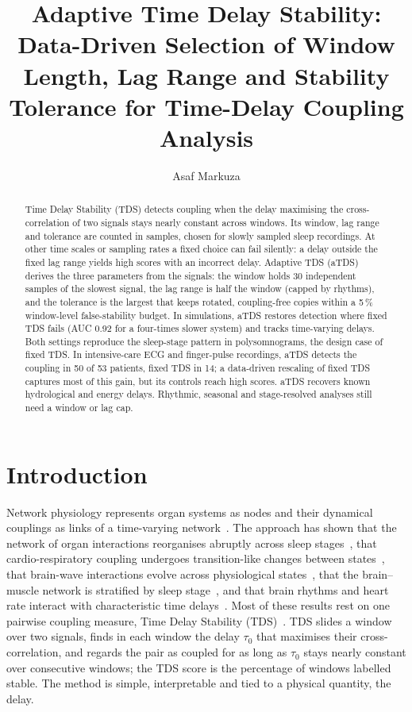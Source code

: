 \documentclass[11pt,a4paper]{article}
\title{Adaptive Time Delay Stability: Data-Driven Selection of Window Length, Lag Range and Stability Tolerance for Time-Delay Coupling Analysis}
\author{Asaf Markuza}
\date{}
\begin{document}
\maketitle

\begin{abstract}
Time Delay Stability (TDS) detects coupling when the delay maximising the cross-correlation of two signals stays nearly constant across windows. Its window, lag range and tolerance are counted in samples, chosen for slowly sampled sleep recordings. At other time scales or sampling rates a fixed choice can fail silently: a delay outside the fixed lag range yields high scores with an incorrect delay. Adaptive TDS (aTDS) derives the three parameters from the signals: the window holds 30 independent samples of the slowest signal, the lag range is half the window (capped by rhythms), and the tolerance is the largest that keeps rotated, coupling-free copies within a 5\,\% window-level false-stability budget. In simulations, aTDS restores detection where fixed TDS fails (AUC 0.92 for a four-times slower system) and tracks time-varying delays. Both settings reproduce the sleep-stage pattern in polysomnograms, the design case of fixed TDS. In intensive-care ECG and finger-pulse recordings, aTDS detects the coupling in 50 of 53 patients, fixed TDS in 14; a data-driven rescaling of fixed TDS captures most of this gain, but its controls reach high scores. aTDS recovers known hydrological and energy delays. Rhythmic, seasonal and stage-resolved analyses still need a window or lag cap.
\end{abstract}

\section{Introduction}
\label{sec:intro}
Network physiology represents organ systems as nodes and their dynamical couplings as links of a time-varying network~\cite{Bashan2012NetworkPhysiology,Bartsch2015NetworkPhysiology,Ivanov2016FocusEmerging,Ivanov2021NewField}. The approach has shown that the network of organ interactions reorganises abruptly across sleep stages~\cite{Bashan2012NetworkPhysiology,Bartsch2015NetworkPhysiology}, that cardio-respiratory coupling undergoes transition-like changes between states~\cite{Bartsch2012PhaseTransitions}, that brain-wave interactions evolve across physiological states~\cite{Liu2015PlasticityBrain,Liu2015MajorComponent}, that the brain--muscle network is stratified by sleep stage~\cite{Rizzo2020NetworkPhysiology,Rizzo2022DynamicNetworks}, and that brain rhythms and heart rate interact with characteristic time delays~\cite{Lin2016DelaycorrelationLandscape}. Most of these results rest on one pairwise coupling measure, Time Delay Stability (TDS)~\cite{Bashan2012NetworkPhysiology,Bartsch2015NetworkPhysiology}. TDS slides a window over two signals, finds in each window the delay $\tau_0$ that maximises their cross-correlation, and regards the pair as coupled for as long as $\tau_0$ stays nearly constant over consecutive windows; the TDS score is the percentage of windows labelled stable. The method is simple, interpretable and tied to a physical quantity, the delay.
\end{document}
